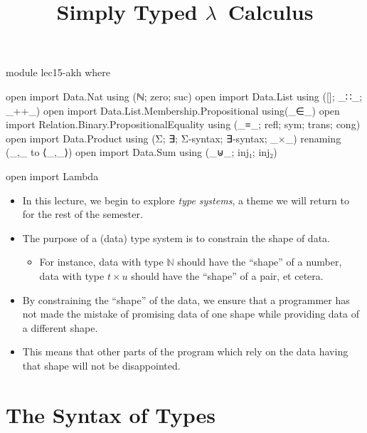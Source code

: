 \documentclass{lecturenotes}
\title{Simply Typed $\lambda$~Calculus}
\begin{document}
\maketitle

\begin{code}[hide]
module lec15-akh where

open import Data.Nat using (ℕ; zero; suc)
open import Data.List using ([]; _∷_; _++_)
open import Data.List.Membership.Propositional using(_∈_)
open import Relation.Binary.PropositionalEquality using (_≡_; refl; sym; trans; cong)
open import Data.Product using (Σ; ∃; Σ-syntax; ∃-syntax; _×_) renaming (_,_ to ⟨_,_⟩)
open import Data.Sum using (_⊎_; inj₁; inj₂)

open import Lambda
\end{code}  

\begin{itemize}
\item In this lecture, we begin to explore \emph{type systems}, a theme we will return to for the rest of the semester.
\item The purpose of a (data) type system is to constrain the shape of data.
  \begin{itemize}
  \item For instance, data with type $\mathbb{N}$ should have the ``shape'' of a number, data with type $t \times u$ should have the ``shape'' of a pair, et cetera.
  \end{itemize}
\item By constraining the ``shape'' of the data, we ensure that a programmer has not made the mistake of promising data of one shape while providing data of a different shape.
\item This means that other parts of the program which rely on the data having that shape will not be disappointed.
\end{itemize}

\section{The Syntax of Types}
\label{sec:syntax-types}
\end{document}
